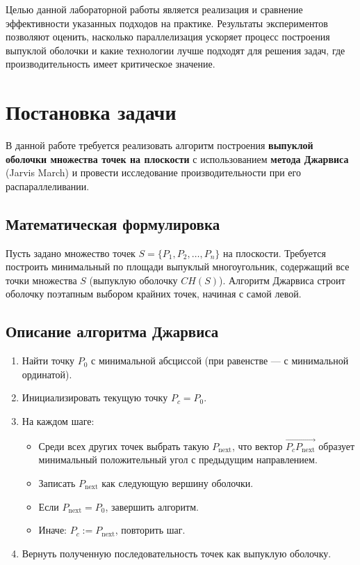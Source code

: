 \documentclass[a4paper,12pt]{article}
\begin{document}
Целью данной лабораторной работы является реализация и сравнение эффективности указанных подходов на практике. Результаты экспериментов позволяют оценить, насколько параллелизация ускоряет процесс построения выпуклой оболочки и какие технологии лучше подходят для решения задач, где производительность имеет критическое значение.

\newpage

\section{Постановка задачи}

В данной работе требуется реализовать алгоритм построения \textbf{выпуклой оболочки множества точек на плоскости} с использованием \textbf{метода Джарвиса} (Jarvis March) и провести исследование производительности при его распараллеливании.

\subsection*{Математическая формулировка}

Пусть задано множество точек $S = \{P_1, P_2, \dots, P_n\}$ на плоскости. Требуется построить минимальный по площади выпуклый многоугольник, содержащий все точки множества $S$ (выпуклую оболочку $CH(S)$). Алгоритм Джарвиса строит оболочку поэтапным выбором крайних точек, начиная с самой левой.

\subsection*{Описание алгоритма Джарвиса}

\begin{enumerate}
    \item Найти точку $P_0$ с минимальной абсциссой (при равенстве — с минимальной ординатой).
    \item Инициализировать текущую точку $P_c = P_0$.
    \item На каждом шаге:
    \begin{itemize}
        \item Среди всех других точек выбрать такую $P_{\text{next}}$, что вектор $\overrightarrow{P_c P_{\text{next}}}$ образует минимальный положительный угол с предыдущим направлением.
        \item Записать $P_{\text{next}}$ как следующую вершину оболочки.
        \item Если $P_{\text{next}} = P_0$, завершить алгоритм.
        \item Иначе: $P_c := P_{\text{next}}$, повторить шаг.
    \end{itemize}
    \item Вернуть полученную последовательность точек как выпуклую оболочку.
\end{enumerate}
\end{document}
